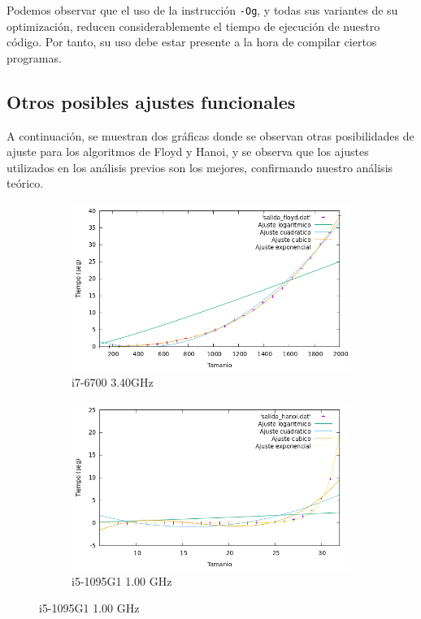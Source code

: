 \documentclass[10pt,a4paper]{article}
\begin{document}
\newpage

Podemos observar que el uso de la instrucción \texttt{-Og}, y todas sus variantes de su optimización, reducen considerablemente el tiempo de ejecución de nuestro código. Por tanto, su uso debe estar presente a la hora de compilar ciertos programas.

\subsection{Otros posibles ajustes funcionales}

A continuación, se muestran dos gráficas donde se observan otras posibilidades de ajuste para los algoritmos de Floyd y Hanoi, y se observa que los ajustes utilizados en los análisis previos son los mejores, confirmando nuestro análisis teórico.

\begin{figure}[h!]
\begin{subfigure}{.5\textwidth}
	\centering
	\includegraphics[scale=0.25]{../../Images/floy_comparacion.png}
	\caption{i7-6700 3.40GHz}
\end{subfigure}
\begin{subfigure}{.5\textwidth}
	\centering
	\includegraphics[scale=0.25]{../../Images/hanoi_comparacion.png}
	\caption{i5-1095G1 1.00 GHz}
\end{subfigure}
\end{figure}
\end{document}
